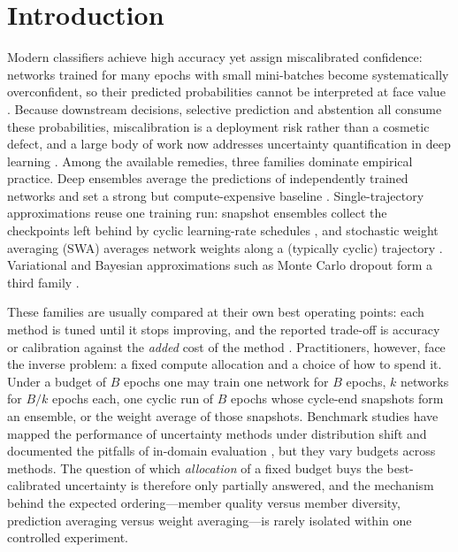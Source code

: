 \documentclass[11pt,a4paper]{article}
\newcommand{\swa}{\textsc{SWA}}
\begin{document}
\vspace{6pt}

\section{Introduction}\label{sec:intro}

Modern classifiers achieve high accuracy yet assign miscalibrated
confidence: networks trained for many epochs with small mini-batches become
systematically overconfident, so their predicted probabilities cannot be
interpreted at face value
\citep{guo2017,abdar2021}. Because downstream decisions, selective
prediction and abstention all consume these probabilities, miscalibration
is a deployment risk rather than a cosmetic defect, and a large body of work
now addresses uncertainty quantification in deep learning
\citep{abdar2021,ovadia2019}. Among the available remedies, three families
dominate empirical practice. Deep ensembles average the predictions of
independently trained networks and set a strong but compute-expensive
baseline \citep{lakshminarayanan2017,fort2019}. Single-trajectory
approximations reuse one training run: snapshot ensembles collect the
checkpoints left behind by cyclic learning-rate schedules
\citep{huang2017,loshchilov2017}, and stochastic weight averaging (\swa)
averages network weights along a (typically cyclic) trajectory
\citep{izmailov2018,wilson2020,maddox2019}. Variational and Bayesian
approximations such as Monte Carlo dropout form a third family
\citep{gal2016,welling2011}.

These families are usually compared at their own best operating points:
each method is tuned until it stops improving, and the reported trade-off is
accuracy or calibration against the \emph{added} cost of the method
\citep{ashukha2020}. Practitioners, however, face the inverse problem: a
fixed compute allocation and a choice of how to spend it. Under a budget of
$B$ epochs one may train one network for $B$ epochs, $k$ networks for
$B/k$ epochs each, one cyclic run of $B$ epochs whose cycle-end snapshots
form an ensemble, or the weight average of those snapshots. Benchmark
studies have mapped the performance of uncertainty methods under
distribution shift and documented the pitfalls of in-domain evaluation
\citep{ovadia2019,ashukha2020}, but they vary budgets across methods. The
question of which \emph{allocation} of a fixed budget buys the
best-calibrated uncertainty is therefore only partially answered, and the
mechanism behind the expected ordering---member quality versus member
diversity, prediction averaging versus weight averaging---is rarely
isolated within one controlled experiment.
\end{document}
